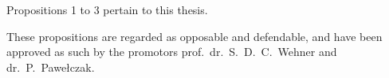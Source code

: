 \bigskip
\noindent
Propositions 1 to 3 pertain to this thesis.

\bigskip
\bigskip

\begin{center}
These propositions are regarded as opposable and defendable, and have been approved as such by the
promotors prof.\ dr.\ S.\ D.\ C.\ Wehner and dr.\ P.\ Pawełczak.
\end{center}
